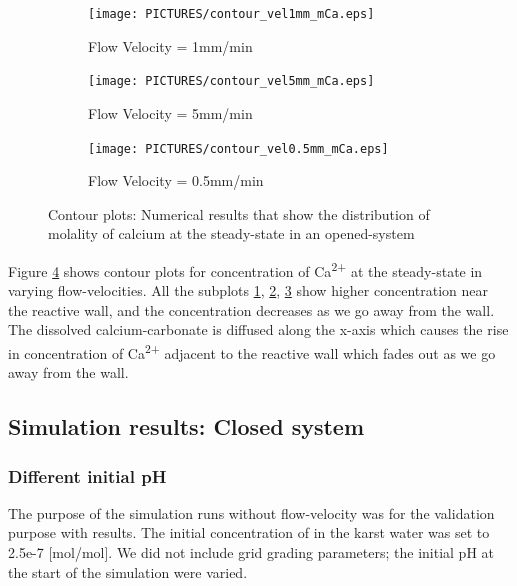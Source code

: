\begin{figure}[!h]
\centering
    \begin{subfigure}{.5\linewidth}
        \centering
        \texttt{[image: PICTURES/contour\_vel1mm\_mCa.eps]}
        \caption{Flow Velocity = 1mm/min}
        \label{fig:CaSteady-state}       %
    \end{subfigure}%
    \hfill
    \begin{subfigure}{.5\linewidth}
        \centering
        \texttt{[image: PICTURES/contour\_vel5mm\_mCa.eps]}
        \caption{Flow Velocity = 5mm/min}
        \label{fig:CaSteady-state5mm}       %
    \end{subfigure}%
    \hfill
    \begin{subfigure}{.5\linewidth}
        \centering
        \texttt{[image: PICTURES/contour\_vel0.5mm\_mCa.eps]}
        \caption{Flow Velocity = 0.5mm/min}
        \label{fig:CaSteady-state0.5mm}       %
    \end{subfigure}%
    \caption{\DuMuX Contour plots: Numerical results that show the distribution of molality of calcium at the steady-state in an opened-system}
     \label{fig:contourCa}
\end{figure}

Figure \ref{fig:contourCa} shows contour plots for concentration of Ca\textsuperscript{2+} at the steady-state in varying flow-velocities. All the subplots \ref{fig:CaSteady-state}, \ref{fig:CaSteady-state5mm}, \ref{fig:CaSteady-state0.5mm} show higher concentration near the reactive wall, and the concentration decreases as we go away from the wall. The dissolved calcium-carbonate is diffused along the x-axis which causes the rise in concentration of Ca\textsuperscript{2+} adjacent to the reactive wall which fades out as we go away from the wall.


\subsection{\DuMuX Simulation results: Closed system}
\subsubsection*{Different initial pH} \label{ssec:diffinitialpHnoflow}
The purpose of the simulation runs without flow-velocity was for the validation purpose with \MATLAB results. The initial concentration of  in the karst water was set to 2.5e-7 [mol/mol]. We did not include grid grading parameters; the initial pH at the start of the simulation were varied.

